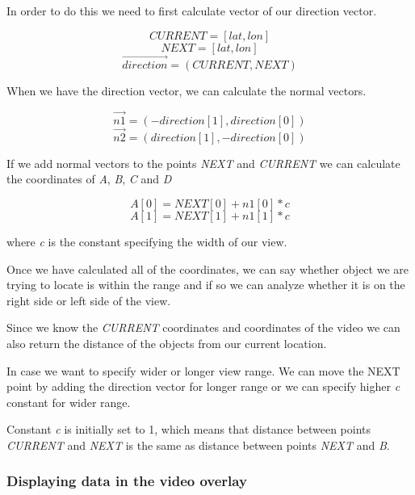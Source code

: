 \documentclass[journal]{IEEEtran}
\begin{document}
In order to do this we need to first calculate vector of our direction vector.

\begin{displaymath}
CURRENT = [lat, lon]
\end{displaymath}
\begin{displaymath}
NEXT = [lat, lon]
\end{displaymath}
\begin{displaymath}
\vec{direction} = (CURRENT, NEXT)
\end{displaymath}

When we have the direction vector, we can calculate the normal vectors.

\begin{displaymath}
\vec{n1} = (-direction[1], direction[0])
\end{displaymath}
\begin{displaymath}
\vec{n2} = (direction[1], -direction[0])
\end{displaymath}

If we add normal vectors to the points \textit{NEXT} and \textit{CURRENT} we can calculate the coordinates of \textit{A}, \textit{B}, \textit{C} and \textit{D}

\begin{displaymath}
A[0] = NEXT[0] + n1[0]*c
\end{displaymath}
\begin{displaymath}
A[1] = NEXT[1] + n1[1]*c
\end{displaymath}

where \textit{c} is the constant specifying the width of our view.

Once we have calculated all of the coordinates, we can say whether object we are trying to locate is within the range and if so we can analyze whether it is on the right side or left side of the view.

Since we know the \textit{CURRENT} coordinates and coordinates of the video we can also return the distance of the objects from our current location.

In case we want to specify wider or longer view range. We can move the NEXT point by adding the direction vector for longer range or we can specify higher \textit{c} constant for wider range.

Constant \textit{c} is initially set to 1, which means that distance between points \textit{CURRENT} and \textit{NEXT} is the same as distance between points \textit{NEXT} and \textit{B}.

\subsubsection{Displaying data in the video overlay}
\end{document}
